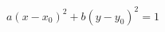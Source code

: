 \documentclass[preview]{standalone}
\begin{document}
\begin{align*}
a(x-x_0)^2 + b(y-y_0)^2 = 1
\end{align*}
\end{document}
